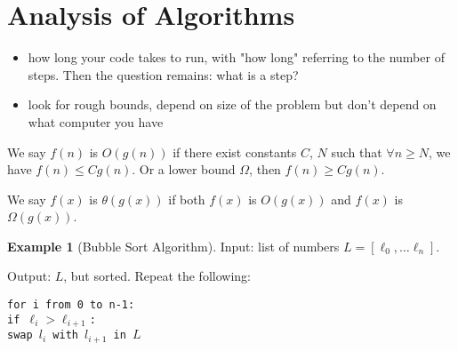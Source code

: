 \documentclass[12pt,letterpaper]{article}
\theoremstyle{definition}
\newtheorem{example}{Example}[section]
\begin{document}
\section{Analysis of Algorithms}

\begin{itemize}
	\item how long your code takes to run, with "how long" referring to the number of steps. Then the question remains: what is a step?
	\item look for rough bounds, depend on size of the problem but don't depend on what computer you have
\end{itemize}

We say $f(n)$ is $O(g(n))$ if there exist constants $C$, $N$ such that $\forall n \geq N$, we have $f(n) \leq Cg(n)$. Or a lower bound $\Omega$, then $f(n) \geq Cg(n)$. 

We say $f(x)$ is $\theta(g(x))$ if both $f(x)$ is $O(g(x))$ and $f(x)$ is $\Omega(g(x))$. 

\begin{example}[Bubble Sort Algorithm]
	Input: list of numbers $L = [\ell_0, \ldots \ell_n]$. 
	
	Output: $L$, but sorted.
	Repeat the following: 
	
	\noindent\texttt{for i from 0 to n-1:}\\
	\hspace*{4ex}\texttt{if $\ell_i > \ell_{i+1}$:}\\
	\hspace*{8ex}\texttt{swap $l_i$ with $l_{i+1}$ in $L$}
	
\end{example}
	
\end{document}

